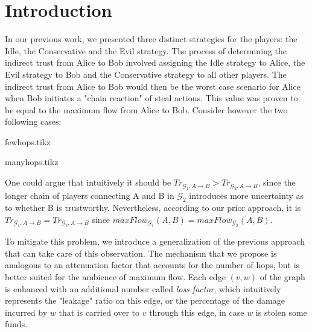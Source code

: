 \section{Introduction}
  In our previous work, we presented three distinct strategies for the players: the Idle, the Conservative and the Evil
  strategy. The process of determining the indirect trust from Alice to Bob involved assigning the Idle strategy to Alice, the
  Evil strategy to Bob and the Conservative strategy to all other players. The indirect trust from Alice to Bob would then be
  the worst case scenario for Alice when Bob initiates a "chain reaction" of steal actions. This value was proven to be equal
  to the maximum flow from Alice to Bob. Consider however the two following cases:

  {fewhops.tikz}

  {manyhops.tikz}

  One could argue that intuitively it should be $Tr_{\mathcal{G}_1, A \rightarrow B} > Tr_{\mathcal{G}_2, A \rightarrow B}$,
  since the longer chain of players connecting A and B in $\mathcal{G}_2$ introduces more uncertainty as to whether B is
  trustworthy. Nevertheless, according to our prior approach, it is $Tr_{\mathcal{G}_1, A \rightarrow B} = Tr_{\mathcal{G}_2,
  A \rightarrow B}$ since $maxFlow_{\mathcal{G}_1}\left(A, B\right) = maxFlow_{\mathcal{G}_2}\left(A, B\right)$.

  To mitigate this problem, we introduce a generalization of the previous approach that can take care of this observation. The
  mechanism that we propose is analogous to an attenuation factor that accounts for the number of hops, but is better suited
  for the ambience of maximum flow. Each edge $\left(v, w\right)$ of the graph is enhanced with an additional number called
  \textit{loss factor}, which intuitively represents the "leakage" ratio on this edge, or the percentage of the damage
  incurred by $w$ that is carried over to $v$ through this edge, in case $w$ is stolen some funds.
